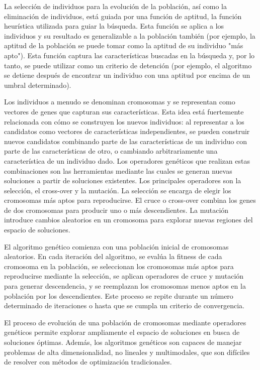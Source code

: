 La selección de individuos para la evolución de la población, así como la eliminación de individuos, está guiada por una función de aptitud, la función heurística utilizada para guiar la búsqueda. Esta función se aplica a los individuos y su resultado es generalizable a la población también (por ejemplo, la aptitud de la población se puede tomar como la aptitud de su individuo "más apto"). 
Esta función captura las características buscadas en la búsqueda y, por lo tanto, se puede utilizar como un criterio de detención (por ejemplo, el algoritmo se detiene después de encontrar un individuo con una aptitud por encima de un umbral determinado).

Los individuos a menudo se denominan cromosomas y se representan como vectores de genes que capturan sus características. Esta idea está fuertemente relacionada con cómo se construyen los nuevos individuos: al representar a los candidatos como vectores de características independientes, se pueden construir nuevos candidatos combinando parte de las características de un individuo con parte de las características de otro, o cambiando arbitrariamente una característica de un individuo dado. Los operadores genéticos que realizan estas combinaciones son las herramientas mediante las cuales se generan nuevas soluciones a partir de soluciones existentes. Los principales operadores son la selección, el cross-over y la mutación. La selección se encarga de elegir los cromosomas más aptos para reproducirse. El cruce o  cross-over combina los genes de dos cromosomas para producir uno o más descendientes. La mutación introduce cambios aleatorios en un cromosoma para explorar nuevas regiones del espacio de soluciones.

El algoritmo genético comienza con una población inicial de cromosomas aleatorios. En cada iteración del algoritmo, se evalúa la fitness de cada cromosoma en la población, se seleccionan los cromosomas más aptos para reproducirse mediante la selección, se aplican operadores de cruce y mutación para generar descendencia, y se reemplazan los cromosomas menos aptos en la población por los descendientes. Este proceso se repite durante un número determinado de iteraciones o hasta que se cumpla un criterio de convergencia.

El proceso de evolución de una población de cromosomas mediante operadores genéticos permite explorar ampliamente el espacio de soluciones en busca de soluciones óptimas. Además, los algoritmos genéticos son capaces de manejar problemas de alta dimensionalidad, no lineales y multimodales, que son difíciles de resolver con métodos de optimización tradicionales.


